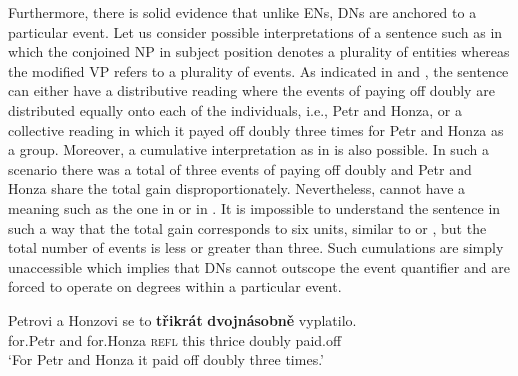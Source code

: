 \documentclass[output=paper,modfonts,hidelinks,newtxmath
\ChapterDOI{10.5281/zenodo.2545513}
]{langscibook}
\begin{document}
\ea {}
\z \z

\noindent Furthermore, there is solid evidence that unlike ENs, DNs are anchored to a particular event. Let us consider possible interpretations of a sentence such as  in which the conjoined NP in subject position denotes a plurality of entities whereas the modified VP refers to a plurality of events. As indicated in  and , the sentence can either have a distributive reading where the events of paying off doubly are distributed equally onto each of the individuals, i.e., Petr and Honza, or a collective reading in which it payed off doubly three times for Petr and Honza as a group. Moreover, a cumulative interpretation as in  is also possible. In such a scenario there was a total of three events of paying off doubly and Petr and Honza share the total gain disproportionately. Nevertheless,  cannot have a meaning such as the one in  or in . It is impossible to understand the sentence in such a way that the total gain corresponds to six units, similar to  or , but the total number of events is less or greater than three. Such cumulations are simply unaccessible which implies that DNs cannot outscope the event quantifier and are forced to operate on degrees within a particular event.

\ea\label{stacked-numerals-int} 
\gll Petrovi a Honzovi se to \textbf{třikrát} \textbf{dvojnásobně} vyplatilo.\\
for.Petr and for.Honza \textsc{refl} this thrice doubly paid.off\\
\glt `For Petr and Honza it paid off doubly three times.'
\z \z
\end{document}
